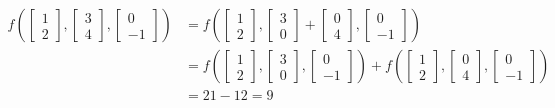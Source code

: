 \documentclass{report}
\begin{document}
$$
\begin{aligned}
f\left(\begin{bmatrix} 1 \\ 2 \end{bmatrix}, \begin{bmatrix} 3 \\ 4 \end{bmatrix}, \begin{bmatrix} 0 \\ -1 \end{bmatrix} \right) & =
f\left(\begin{bmatrix} 1 \\ 2 \end{bmatrix}, \begin{bmatrix} 3 \\ 0 \end{bmatrix} + \begin{bmatrix} 0 \\ 4 \end{bmatrix}, \begin{bmatrix} 0 \\ -1 \end{bmatrix} \right) \\
& = f\left(\begin{bmatrix} 1 \\ 2 \end{bmatrix}, \begin{bmatrix} 3 \\ 0 \end{bmatrix}, \begin{bmatrix} 0 \\ -1 \end{bmatrix} \right) +
f\left(\begin{bmatrix} 1 \\ 2 \end{bmatrix}, \begin{bmatrix} 0 \\ 4 \end{bmatrix}, \begin{bmatrix} 0 \\ -1 \end{bmatrix} \right) \\
& = 21 - 12 = 9
\end{aligned}
$$
\end{document}
